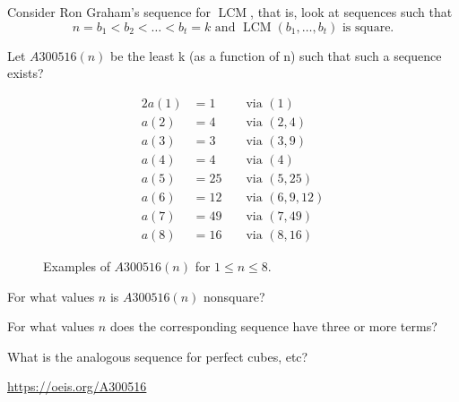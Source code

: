 \documentclass{article}
\begin{document}
  Consider Ron Graham's sequence for $\operatorname{LCM}$, that is, look at sequences such that \[
    n = b_1 < b_2 < \hdots < b_t = k \text{ and } \operatorname{LCM}(b_1,\hdots,b_t) \text{ is square.}
  \]
\begin{question}
  Let $A300516(n)$ be the least k (as a function of n) such that such a sequence
  exists?
\end{question}
\begin{figure}[!h]
  \centering
  \begin{alignat*}{2}
  a(1) &= 1  &&\text{ via } (1)\\
  a(2) &= 4  &&\text{ via } (2, 4)\\
  a(3) &= 3  &&\text{ via } (3, 9)\\
  a(4) &= 4  &&\text{ via } (4)\\
  a(5) &= 25 &&\text{ via } (5, 25)\\
  a(6) &= 12 &&\text{ via } (6, 9, 12)\\
  a(7) &= 49 &&\text{ via } (7, 49)\\
  a(8) &= 16 &&\text{ via } (8, 16)
  \end{alignat*}
  \caption{
    Examples of $A300516(n)$ for $1 \leq n \leq 8$.
  }
\end{figure}

\begin{related}
  \item For what values $n$ is $A300516(n)$ nonsquare?
  \item For what values $n$ does the corresponding sequence have three or more terms?
  \item What is the analogous sequence for perfect cubes, etc?
\end{related}

\begin{references}
  \item \url{https://oeis.org/A300516}
\end{references}
\end{document}
